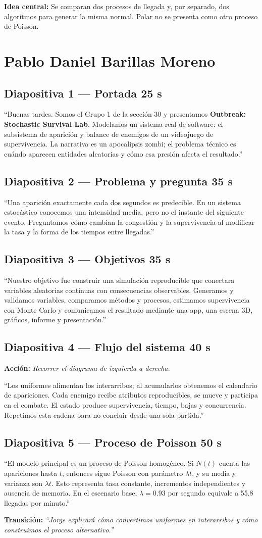 \documentclass[11pt,a4paper]{article}
\newcommand{\slidecue}[4]{%
  \subsection*{\textcolor{outbreakgreen}{Diapositiva #1 --- #2}\hfill
  \normalfont\small #3}
  \noindent\colorbox{outbreakpale}{\parbox{\dimexpr\textwidth-2\fboxsep}{#4}}
  \vspace{0.45em}}
\newcommand{\stage}[1]{\textbf{\textcolor{outbreakamber}{Acción:}} \emph{#1}\par}
\newcommand{\handoff}[1]{\vspace{0.4em}\textbf{Transición:} \emph{#1}\par}
\newcommand{\keyidea}[1]{%
  \noindent\colorbox{outbreakdark}{\parbox{\dimexpr\textwidth-2\fboxsep}{%
  \color{white}\textbf{Idea central:} #1}}}
\begin{document}
\keyidea{Se comparan dos procesos de llegada y, por separado, dos algoritmos
para generar la misma normal. Polar no se presenta como otro proceso de Poisson.}

\section{Pablo Daniel Barillas Moreno}

\slidecue{1}{Portada}{25 s}{
``Buenas tardes. Somos el Grupo 1 de la sección 30 y presentamos
\textbf{Outbreak: Stochastic Survival Lab}. Modelamos un sistema real de
software: el subsistema de aparición y balance de enemigos de un videojuego de
supervivencia. La narrativa es un apocalipsis zombi; el problema técnico es
cuándo aparecen entidades aleatorias y cómo esa presión afecta el resultado.''
}

\slidecue{2}{Problema y pregunta}{35 s}{
``Una aparición exactamente cada dos segundos es predecible. En un sistema
estocástico conocemos una intensidad media, pero no el instante del siguiente
evento. Preguntamos cómo cambian la congestión y la supervivencia al modificar la
tasa y la forma de los tiempos entre llegadas.''
}

\slidecue{3}{Objetivos}{35 s}{
``Nuestro objetivo fue construir una simulación reproducible que conectara
variables aleatorias continuas con consecuencias observables. Generamos y
validamos variables, comparamos métodos y procesos, estimamos supervivencia con
Monte Carlo y comunicamos el resultado mediante una app, una escena 3D,
gráficos, informe y presentación.''
}

\slidecue{4}{Flujo del sistema}{40 s}{
\stage{Recorrer el diagrama de izquierda a derecha.}
``Los uniformes alimentan los interarribos; al acumularlos obtenemos el
calendario de apariciones. Cada enemigo recibe atributos reproducibles, se
mueve y participa en el combate. El estado produce supervivencia, tiempo,
bajas y concurrencia. Repetimos esta cadena para no concluir desde una sola
partida.''
}

\slidecue{5}{Proceso de Poisson}{50 s}{
``El modelo principal es un proceso de Poisson homogéneo. Si $N(t)$ cuenta las
apariciones hasta $t$, entonces sigue Poisson con parámetro $\lambda t$, y su
media y varianza son $\lambda t$. Esto representa tasa constante, incrementos
independientes y ausencia de memoria. En el escenario base, $\lambda=0.93$ por
segundo equivale a 55.8 llegadas por minuto.''
}

\handoff{``Jorge explicará cómo convertimos uniformes en interarribos y cómo
construimos el proceso alternativo.''}
\end{document}
